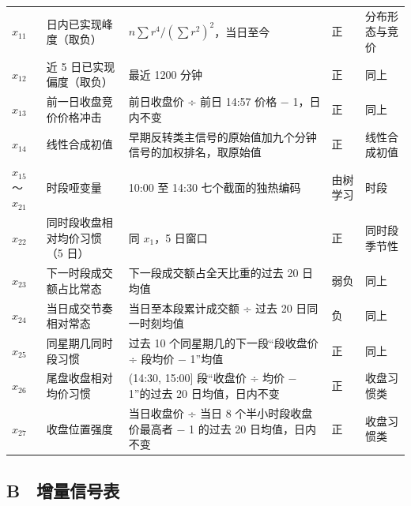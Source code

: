 \documentclass[UTF8,a4paper,zihao=-4,fontset=none]{ctexart}
\begin{document}
{\begin{xltabular}{\textwidth}{@{}P{1.3cm} P{3.1cm} L P{0.9cm} P{1.9cm}@{}}
$x_{11}$ & 日内已实现峰度（取负） & $n\sum r^4/(\sum r^2)^2$，当日至今 & 正 & 分布形态与竞价\\
$x_{12}$ & 近 5 日已实现偏度（取负） & 最近 1200 分钟 & 正 & 同上\\
$x_{13}$ & 前一日收盘竞价价格冲击 & 前日收盘价 ÷ 前日 14:57 价格 − 1，日内不变 & 正 & 同上\\
$x_{14}$ & 线性合成初值 & 早期反转类主信号的原始值加九个分钟信号的加权排名，取原始值 & 正 & 线性合成初值\\
$x_{15}$～$x_{21}$ & 时段哑变量 & 10:00 至 14:30 七个截面的独热编码 & 由树学习 & 时段\\
$x_{22}$ & 同时段收盘相对均价习惯（5 日） & 同 $x_1$，5 日窗口 & 正 & 同时段季节性\\
$x_{23}$ & 下一时段成交额占比常态 & 下一段成交额占全天比重的过去 20 日均值 & 弱负 & 同上\\
$x_{24}$ & 当日成交节奏相对常态 & 当日至本段累计成交额 ÷ 过去 20 日同一时刻均值 & 负 & 同上\\
$x_{25}$ & 同星期几同时段习惯 & 过去 10 个同星期几的下一段“段收盘价 ÷ 段均价 − 1”均值 & 正 & 同上\\
$x_{26}$ & 尾盘收盘相对均价习惯 & (14:30, 15:00] 段“收盘价 ÷ 均价 − 1”的过去 20 日均值，日内不变 & 正 & 收盘习惯类\\
$x_{27}$ & 收盘位置强度 & 当日收盘价 ÷ 当日 8 个半小时段收盘价最高者 − 1 的过去 20 日均值，日内不变 & 正 & 收盘习惯类\\
\end{xltabular}}

\subsection*{B　增量信号表}
\end{document}

